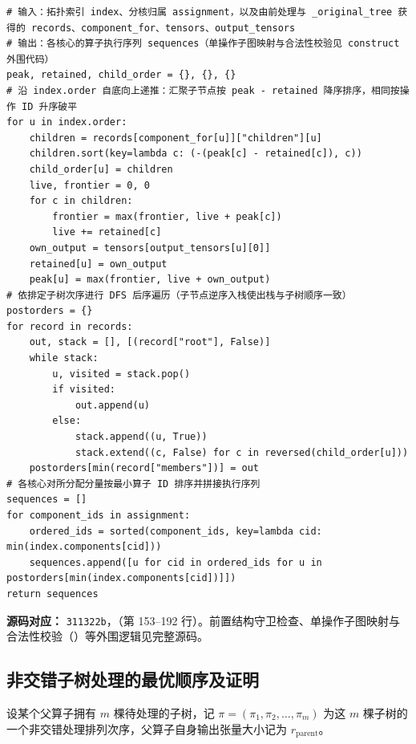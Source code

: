 \documentclass[anonymous,notoc]{gmcm2026}
\begin{document}
\FloatBarrier
\begin{algorithm}[!htbp]
\caption{归约森林核心排序与DFS局部步骤}\label{alg:p3-forest-memory-order}
\small


\begin{lstlisting}[style=paperpseudo]
# 输入：拓扑索引 index、分核归属 assignment，以及由前处理与 _original_tree 获得的 records、component_for、tensors、output_tensors
# 输出：各核心的算子执行序列 sequences（单操作子图映射与合法性校验见 construct 外围代码）
peak, retained, child_order = {}, {}, {}
# 沿 index.order 自底向上递推：汇聚子节点按 peak - retained 降序排序，相同按操作 ID 升序破平
for u in index.order:
    children = records[component_for[u]]["children"][u]
    children.sort(key=lambda c: (-(peak[c] - retained[c]), c))
    child_order[u] = children
    live, frontier = 0, 0
    for c in children:
        frontier = max(frontier, live + peak[c])
        live += retained[c]
    own_output = tensors[output_tensors[u][0]]
    retained[u] = own_output
    peak[u] = max(frontier, live + own_output)
# 依排定子树次序进行 DFS 后序遍历（子节点逆序入栈使出栈与子树顺序一致）
postorders = {}
for record in records:
    out, stack = [], [(record["root"], False)]
    while stack:
        u, visited = stack.pop()
        if visited:
            out.append(u)
        else:
            stack.append((u, True))
            stack.extend((c, False) for c in reversed(child_order[u]))
    postorders[min(record["members"])] = out
# 各核心对所分配分量按最小算子 ID 排序并拼接执行序列
sequences = []
for component_ids in assignment:
    ordered_ids = sorted(component_ids, key=lambda cid: min(index.components[cid]))
    sequences.append([u for cid in ordered_ids for u in postorders[min(index.components[cid])]])
return sequences
\end{lstlisting}
\textbf{源码对应：} \texttt{311322b}，\texttt{}（第 153--192 行）。前置结构守卫检查、单操作子图映射与合法性校验（\texttt{}）等外围逻辑见完整源码。

\end{algorithm}
\FloatBarrier

\subsection{非交错子树处理的最优顺序及证明}

设某个父算子拥有 \(m\) 棵待处理的子树，记 \(\pi = (\pi_1, \pi_2, \dots, \pi_m)\) 为这 \(m\) 棵子树的一个非交错处理排列次序，父算子自身输出张量大小记为 \(r_{\mathrm{parent}}\)。
\end{document}
